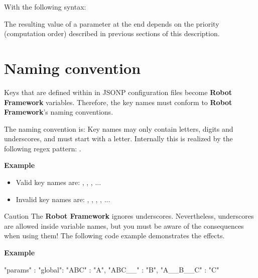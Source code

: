 With the following syntax:


The resulting value of a parameter at the end depends on the priority (computation order) described in previous sections of this description.

\newpage

\section{Naming convention}

Keys that are defined within  in JSONP configuration files become \textbf{Robot Framework} variables. Therefore, the key names
must conform to \textbf{Robot Framework}'s naming conventions.

The naming convention is: Key names may only contain letters, digits and underscores, and must start with a letter.
Internally this is realized by the following regex pattern: .

\textbf{Example}

\begin{itemize}
   \item Valid key names are: , , , ...
   \item Invalid key names are: , , , , ...
\end{itemize}

\begin{boxwarning}{Caution}
The \textbf{Robot Framework} ignores underscores. Nevertheless, underscores are allowed inside variable names, but you must be aware of the consequences
when using them! The following code example demonstrates the effects.
\end{boxwarning}

\vspace{2ex}

\textbf{Example}

\begin{pythoncode}
"params" : {
             "global": {
                         "ABC"     : "A",
                         "ABC__"   : "B",
                         "A__B__C" : "C"
                       }
           }
\end{pythoncode}


